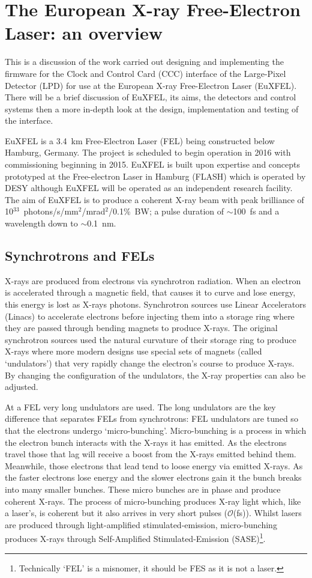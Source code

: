 \section{The European X-ray Free-Electron Laser: an overview} %
\label{sec:xfel_an_overview}
This is a discussion of the work carried out designing and implementing the firmware for the Clock and Control Card (CCC) interface of the Large-Pixel Detector (LPD) for use at the European X-ray Free-Electron Laser (EuXFEL). There will be a brief discussion of EuXFEL, its aims, the detectors and control systems then a more in-depth look at the design, implementation and testing of the interface.

EuXFEL is a 3.4~km Free-Electron Laser (FEL) being constructed below Hamburg, Germany. The project is scheduled to begin operation in 2016 with commissioning beginning in 2015. EuXFEL is built upon expertise and concepts prototyped at the Free-electron Laser in Hamburg (FLASH) which is operated by DESY although EuXFEL will be operated as an independent research facility. The aim of EuXFEL is to produce a coherent X-ray beam with peak brilliance of 10\(^{33}\)~photons/s/mm\(^2\)/mrad\(^2\)/0.1\%~BW; a pulse duration of \( \sim \)100~fs and a wavelength down to \( \sim \)0.1~nm.


\subsection{Synchrotrons and FELs} %
\label{sub:synchrotrons_and_fels}
X-rays are produced from electrons via synchrotron radiation. When an electron is accelerated through a magnetic field, that causes it to curve and lose energy, this energy is lost as X-rays photons. Synchrotron sources use Linear Accelerators (Linacs) to accelerate electrons before injecting them into a storage ring where they are passed through bending magnets to produce X-rays. The original synchrotron sources used the natural curvature of their storage ring to produce X-rays where more modern designs use special sets of magnets (called `undulators') that very rapidly change the electron's course to produce X-rays. By changing the configuration of the undulators, the X-ray properties can also be adjusted. 

At a FEL very long undulators are used. The long undulators are the key difference that separates FELs from synchrotrons: FEL undulators are tuned so that the electrons undergo `micro-bunching'. Micro-bunching is a process in which the electron bunch interacts with the X-rays it has emitted. As the electrons travel those that lag will receive a boost from the X-rays emitted behind them. Meanwhile, those electrons that lead tend to loose energy via emitted X-rays. As the faster electrons lose energy and the slower electrons gain it the bunch breaks into many smaller bunches. These micro bunches are in phase and produce coherent X-rays. The process of micro-bunching produces X-ray light which, like a laser's, is coherent but it also arrives in very short pulses (\(\mathcal{O}\)(fs)). Whilst lasers are produced through light-amplified stimulated-emission, micro-bunching produces X-rays through Self-Amplified Stimulated-Emission (SASE)\footnote{Technically `FEL' is a misnomer, it should be FES as it is not a laser.}.

